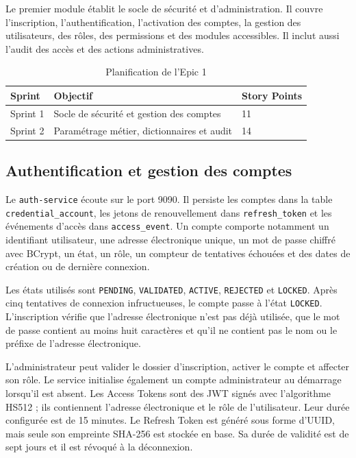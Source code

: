 Le premier module établit le socle de sécurité et d’administration. Il couvre l’inscription, l’authentification, l’activation des comptes, la gestion des utilisateurs, des rôles, des permissions et des modules accessibles. Il inclut aussi l’audit des accès et des actions administratives.

\begin{table}[H]
\centering
\caption{Planification de l’Epic 1}
\begin{tabular}{lll}
\toprule
\textbf{Sprint} & \textbf{Objectif} & \textbf{Story Points} \\
\midrule
Sprint 1 & Socle de sécurité et gestion des comptes & 11 \\
Sprint 2 & Paramétrage métier, dictionnaires et audit & 14 \\
\bottomrule
\end{tabular}
\end{table}

\subsection{Authentification et gestion des comptes}

Le \texttt{auth-service} écoute sur le port 9090. Il persiste les comptes dans la table \texttt{credential\_account}, les jetons de renouvellement dans \texttt{refresh\_token} et les événements d’accès dans \texttt{access\_event}. Un compte comporte notamment un identifiant utilisateur, une adresse électronique unique, un mot de passe chiffré avec BCrypt, un état, un rôle, un compteur de tentatives échouées et des dates de création ou de dernière connexion.

Les états utilisés sont \texttt{PENDING}, \texttt{VALIDATED}, \texttt{ACTIVE}, \texttt{REJECTED} et \texttt{LOCKED}. Après cinq tentatives de connexion infructueuses, le compte passe à l’état \texttt{LOCKED}. L’inscription vérifie que l’adresse électronique n’est pas déjà utilisée, que le mot de passe contient au moins huit caractères et qu’il ne contient pas le nom ou le préfixe de l’adresse électronique.

L’administrateur peut valider le dossier d’inscription, activer le compte et affecter son rôle. Le service initialise également un compte administrateur au démarrage lorsqu’il est absent. Les Access Tokens sont des JWT signés avec l’algorithme HS512 ; ils contiennent l’adresse électronique et le rôle de l’utilisateur. Leur durée configurée est de 15 minutes. Le Refresh Token est généré sous forme d’UUID, mais seule son empreinte SHA-256 est stockée en base. Sa durée de validité est de sept jours et il est révoqué à la déconnexion.

